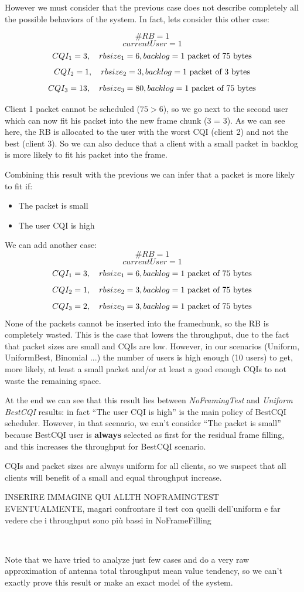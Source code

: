 However we must consider that the previous case does not describe completely all the possible behaviors of the system. In fact, lets consider this other case:

\[\#RB = 1\]
\[currentUser = 1\]
\[CQI_1 = 3, \quad rbsize_1 = 6, backlog = \textnormal{1 packet of 75 bytes}\]
\[CQI_2 = 1, \quad rbsize_2 = 3, backlog = \textnormal{1 packet of 3 bytes}\]
\[CQI_3 = 13, \quad rbsize_3 = 80, backlog = \textnormal{1 packet of 75 bytes}\]

Client 1 packet cannot be scheduled (\(75 > 6\)), so we go next to the second user which can now fit his packet into the new frame chunk (3 = 3). As we can see here, the RB is allocated to the user with the worst CQI (client 2) and not the best (client 3). So we can also deduce that a client with a small packet in backlog is more likely to fit his packet into the frame.

Combining this result with the previous we can infer that a packet is more likely to fit if:
\begin{itemize}
	\item The packet is small
	\item The user CQI is high
\end{itemize}
We can add another case:
\[\#RB = 1\]
\[currentUser = 1\]
\[CQI_1 = 3, \quad rbsize_1 = 6, backlog = \textnormal{1 packet of 75 bytes}\]
\[CQI_2 = 1, \quad rbsize_2 = 3, backlog = \textnormal{1 packet of 75 bytes}\]
\[CQI_3 = 2, \quad rbsize_3 = 3, backlog = \textnormal{1 packet of 75 bytes}\]
None of the packets cannot be inserted into the framechunk, so the RB is completely wasted. This is the case that lowers the throughput, due to the fact that packet sizes are small and CQIs are low. However, in our scenarios (Uniform, UniformBest, Binomial ...) the number of users is high enough (10 users) to get, more likely, at least a small packet and/or at least a good enough CQIs to not waste the remaining space.

At the end we can see that this result lies between \textit{NoFramingTest} and \textit{Uniform BestCQI} results: in fact ``The user CQI is high'' is the main policy of BestCQI scheduler. However, in that scenario, we can't consider ``The packet is small'' because BestCQI user is \textbf{always} selected as first for the residual frame filling, and this increases the throughput for BestCQI scenario.

CQIs and packet sizes are always uniform for all clients, so we suspect that all clients will benefit of a small and equal throughput increase.
\begin{center}
	INSERIRE IMMAGINE QUI ALLTH NOFRAMINGTEST EVENTUALMENTE, magari confrontare il test con quelli dell'uniform e far vedere che i throughput sono più bassi in NoFrameFilling
\end{center}
\

Note that we have tried to analyze just few cases and do a very raw approximation of antenna total throughput mean value tendency, so we can't exactly prove this result or make an exact model of the system.